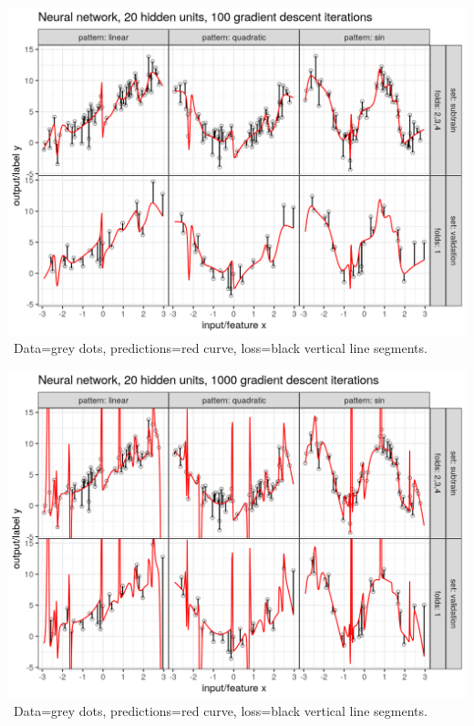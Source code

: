 \begin{frame}
  \includegraphics[width=\textwidth]{figure-overfitting-pred-units=20-maxit=100.png}
\
Data=grey dots, predictions=red curve, loss=black vertical line segments.
\end{frame}


\begin{frame}
  \includegraphics[width=\textwidth]{figure-overfitting-pred-units=20-maxit=1000.png}
\
Data=grey dots, predictions=red curve, loss=black vertical line segments.
\end{frame}


